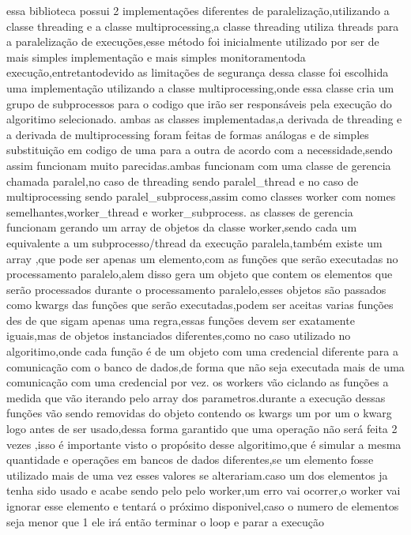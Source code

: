 \documentclass[
	12pt,				%
	openright,			%
	oneside,			%
	a4paper,			%
	english,			%
	french,				%
	spanish,			%
	brazil,				%
	]{abntex2}
\begin{document}
essa biblioteca possui 2 implementações diferentes de paralelização,utilizando a classe threading e a classe multiprocessing,a classe threading utiliza threads para a paralelização de execuções,esse método foi inicialmente utilizado por ser de mais simples implementação e mais simples monitoramentoda execução,entretantodevido as limitações de segurança dessa classe foi escolhida uma implementação utilizando a classe multiprocessing,onde essa classe cria um grupo de subprocessos para o codigo que irão ser responsáveis pela execução do algoritimo selecionado.
ambas as classes implementadas,a derivada de threading e a derivada de multiprocessing foram feitas de formas análogas e de simples substituição em codigo de uma para a outra de acordo com a necessidade,sendo assim funcionam muito parecidas.ambas funcionam com uma classe de gerencia chamada paralel,no caso de threading sendo paralel_thread e no caso de multiprocessing sendo paralel_subprocess,assim como classes worker com nomes semelhantes,worker_thread e worker_subprocess.
as classes de gerencia funcionam gerando um array de objetos da classe worker,sendo cada um equivalente a um subprocesso/thread da execução paralela,também existe um array ,que pode ser apenas um elemento,com as funções que serão executadas no processamento paralelo,alem disso gera um objeto que contem os elementos que serão processados durante o processamento paralelo,esses objetos são passados como kwargs das funções que serão executadas,podem ser aceitas varias funções des de que sigam apenas uma regra,essas funções devem ser exatamente iguais,mas de objetos instanciados diferentes,como no caso utilizado no algoritimo,onde cada função é de um objeto com uma credencial diferente para a comunicação com o banco de dados,de forma que não seja executada mais de uma comunicação com uma credencial por vez.
os workers vão ciclando as funções a medida que vão iterando pelo array dos parametros.durante a execução dessas funções vão sendo removidas do objeto contendo os kwargs um por um o kwarg logo antes de ser usado,dessa forma garantido que uma operação não será feita 2 vezes ,isso é importante visto o propósito desse algoritimo,que é simular a mesma quantidade e operações em bancos de dados diferentes,se um elemento fosse utilizado mais de uma vez esses valores se alterariam.caso um dos elementos ja tenha sido usado e acabe sendo pelo pelo worker,um erro vai ocorrer,o worker vai ignorar esse elemento e tentará o próximo disponivel,caso o numero de elementos seja menor que 1 ele irá então terminar o loop e parar a execução
\end{document}
